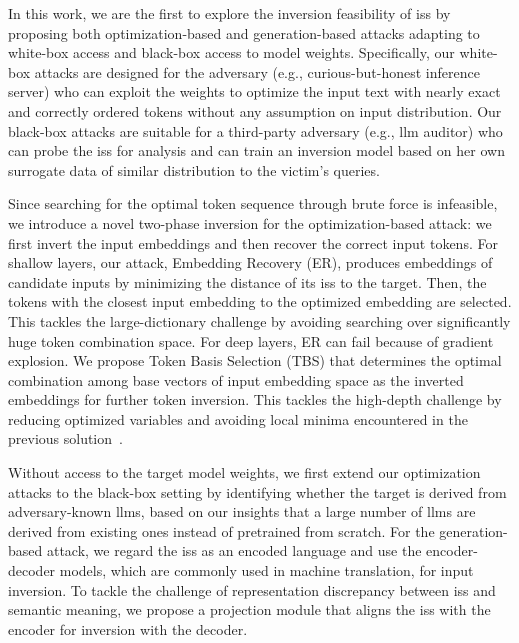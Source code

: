 \documentclass[letterpaper,twocolumn,10pt]{article}
\newcommand{\eg}{\hbox{{e.g.}}\xspace}
\theoremstyle{definition}
\begin{document}
In this work, we are the first to explore the inversion feasibility of \acp{is} by proposing both optimization-based and generation-based attacks adapting to white-box access and black-box access to model weights.
Specifically, our white-box attacks are designed for the adversary (\eg, curious-but-honest inference server) who can exploit the weights to optimize the input text with nearly exact and correctly ordered tokens without any assumption on input distribution.
Our black-box attacks are suitable for a third-party adversary (\eg, \ac{llm} auditor) who can probe the \acp{is} for analysis and can train an inversion model based on her own surrogate data of similar distribution to the victim's queries.



Since searching for the optimal token sequence through brute force is infeasible, we introduce a novel two-phase inversion for the optimization-based attack: we first invert the input embeddings and then recover the correct input tokens.
For shallow layers, our attack, Embedding Recovery (ER), produces embeddings of candidate inputs by minimizing the distance of its \acp{is} to the target.
Then, the tokens with the closest input embedding to the optimized embedding are selected.
This tackles the large-dictionary challenge by avoiding searching over significantly huge token combination space.
For deep layers, ER can fail because of gradient explosion.
We propose Token Basis Selection (TBS) that determines the optimal combination among base vectors of input embedding space as the inverted embeddings for further token inversion.
This tackles the high-depth challenge by reducing optimized variables and avoiding local minima encountered in the previous solution~\cite{song2020information}.


Without access to the target model weights, we first extend our optimization attacks to the black-box setting by identifying whether the target is derived from adversary-known \acp{llm}, based on our insights that a large number of \acp{llm} are derived from existing ones instead of pretrained from scratch.
For the generation-based attack, we regard the \acp{is} as an encoded language and use the encoder-decoder models, which are commonly used in machine translation, for input inversion.
To tackle the challenge of representation discrepancy between \acp{is} and semantic meaning, we propose a projection module that aligns the \acp{is} with the encoder for inversion with the decoder.
\end{document}
